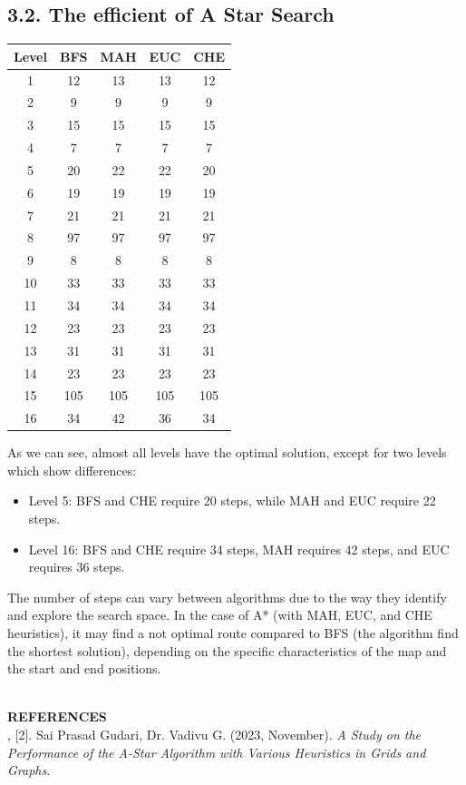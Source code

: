 \documentclass[english, a4paper,12pt]{article}
\begin{document}
\subsection*{3.2. The efficient of A Star Search}
\small\begin{minipage}{0.4\textwidth}
\begin{tabular}{|c|c|c|c|c|}
\hline
Level & BFS & MAH & EUC & CHE \\
\hline
1 & 12 & 13 & 13 & 12 \\
2 & 9 & 9 & 9 & 9 \\
3 & 15 & 15 & 15 & 15 \\
4 & 7 & 7 & 7 & 7\\
5 & 20 & 22 & 22 & 20\\
6 & 19 & 19 & 19 & 19\\
7 & 21 & 21 & 21 & 21\\
8 & 97 & 97 & 97 & 97\\
9 & 8 & 8 & 8 & 8\\
10 & 33 & 33 & 33 & 33\\
11 & 34 & 34 & 34 & 34\\
12 & 23 & 23 & 23 & 23\\
13 & 31 & 31 & 31 & 31\\
14 & 23 & 23 & 23 & 23 \\
15 & 105 & 105 & 105 & 105\\
16 & 34 & 42 & 36 & 34\\
\hline
\end{tabular}
\end{minipage}
\begin{minipage}{0.6\textwidth}
As we can see, almost all levels have the optimal solution, except for two levels which show differences:
\begin{itemize}
    \item Level 5: BFS and CHE require 20 steps, while MAH and EUC require 22 steps.
    \item Level 16: BFS and CHE require 34 steps, MAH requires 42 steps, and EUC requires 36 steps. 
\end{itemize}
The number of steps can vary between algorithms due to the way they identify and explore the search space. In the case of A* (with MAH, EUC, and CHE heuristics), it may find a not optimal route compared to BFS (the algorithm find the shortest solution), depending on the specific characteristics of the map and the start and end positions.
\end{minipage}
\vspace*{2mm}
\\
\textbf{REFERENCES}
\vspace*{2mm}
\\
\text{[1]}, [2]. Sai Prasad Gudari, Dr. Vadivu G. (2023, November). \textit{A Study on the Performance of the A-Star Algorithm with Various Heuristics in Grids and Graphs}.
\end{document}
